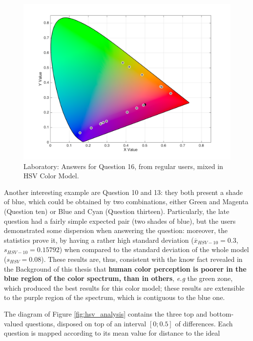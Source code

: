 \begin{enumerate}
\begin{figure}[!htbp]
\begin{minipage}{0.48\textwidth}
      \includegraphics[width=\textwidth]{images/results/16_lab_HSVresponses.png}
      \caption[Laboratory: Answers for Question 16, from regular users, mixed in HSV Color Model.]{Laboratory: Answers for Question 16, from regular users, mixed in HSV Color Model.}
      \label{fig:labhsvregular_16}
    \end{minipage}
    \vspace{-5pt}
  \end{figure}
\end{enumerate} \par
%
Another interesting example are Question 10 and 13: they both present a shade of blue, which could be obtained by two combinations, either Green and Magenta (Question ten) or Blue and Cyan (Question thirteen). Particularly, the
late question had a fairly simple expected pair (two shades of blue), but the users demonstrated some dispersion when answering the question: moreover, the statistics prove it, by having a rather high standard deviation
($\overline{x}_{HSV-10} = 0.3$, $s_{HSV-10} = 0.15792$) when compared to the standard deviation of the whole model ($s_{HSV} = 0.08$). These results are, thus, consistent with the know fact revealed in the Background of this thesis that
\textbf{human color perception is poorer in the blue region of the color spectrum, than in others}, \emph{e.g} the green zone, which produced the best results for this color model; these results are extensible to the purple region
of the spectrum, which is contiguous to the blue one. \par
%
The diagram of Figure \ref{fig:hsv_analysis} contains the three top and bottom-valued questions, disposed on top of an interval $[0 ; 0.5]$ of differences. Each question is mapped according to its mean value for distance to the ideal
